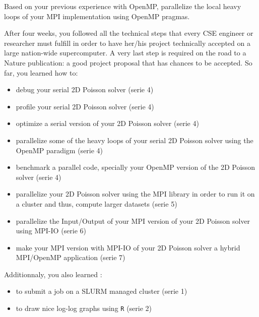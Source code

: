 \documentclass[11pt,a4paper]{article}
\begin{document}


\begin{exercise}

Based on your previous experience with OpenMP, parallelize the local heavy loops of your MPI implementation using OpenMP pragmas. 

\end{exercise}



\begin{exercise}

After four weeks, you followed all the technical steps that every CSE engineer or researcher must fulfill in order to have her/his project technically accepted on a large nation-wide supercomputer. A very last step is required on the road to a Nature publication: a good project proposal that has chances to be accepted. So far, you learned how to:

\begin{itemize}
	\item {debug your serial 2D Poisson solver (serie 4)}
	\item {profile your serial 2D Poisson solver (serie 4)}
	\item {optimize a serial version of your 2D Poisson solver (serie 4)}
	\item {parallelize some of the heavy loops of your serial 2D Poisson solver using the OpenMP paradigm (serie 4)}
	\item {benchmark a parallel code, specially your OpenMP version of the 2D Poisson solver (serie 4)}
	\item {parallelize your 2D Poisson solver using the MPI library in order to run it on a cluster and thus, compute larger datasets (serie 5)}
	\item {parallelize the Input/Output of your MPI version of your 2D Poisson solver using MPI-IO (serie 6)}
	\item {make your MPI version with MPI-IO of your 2D Poisson solver a hybrid MPI/OpenMP application (serie 7)}
\end{itemize}

Additionnaly, you also learned :

\begin{itemize}
	\item {to submit a job on a SLURM managed cluster (serie 1) }
	\item {to draw nice log-log graphs using \texttt{R} (serie 2) }
\end{itemize}


\end{exercise}
\end{document}
